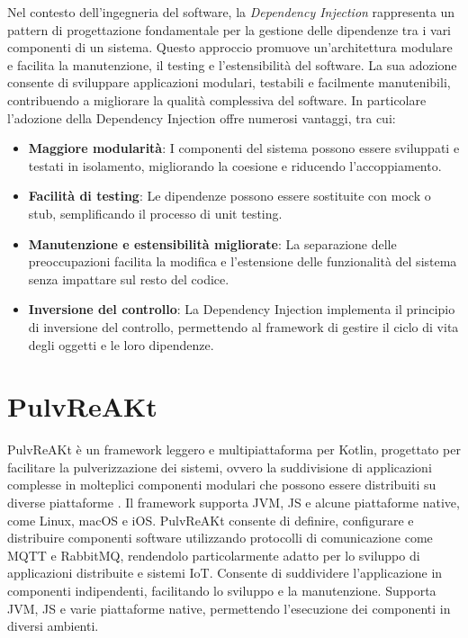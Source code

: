 \documentclass[12pt,a4paper,openright,twoside]{book}
\begin{document}
Nel contesto dell'ingegneria del software, la \textit{Dependency Injection} rappresenta un pattern di progettazione fondamentale per la gestione
delle dipendenze tra i vari componenti di un sistema. Questo approccio promuove un'architettura modulare e facilita la manutenzione, il testing e l'estensibilità del software.
La sua adozione consente di sviluppare applicazioni modulari, testabili e facilmente manutenibili, contribuendo a migliorare la qualità complessiva del software.
In particolare l'adozione della Dependency Injection offre numerosi vantaggi, tra cui:
\begin{itemize}
    \item \textbf{Maggiore modularità}: I componenti del sistema possono essere sviluppati e testati in isolamento, migliorando la coesione e riducendo l'accoppiamento.
    \item \textbf{Facilità di testing}: Le dipendenze possono essere sostituite con mock o stub, semplificando il processo di unit testing.
    \item \textbf{Manutenzione e estensibilità migliorate}: La separazione delle preoccupazioni facilita la modifica e l'estensione delle funzionalità del sistema
     senza impattare sul resto del codice.
    \item \textbf{Inversione del controllo}: La Dependency Injection implementa il principio di inversione del controllo,
     permettendo al framework di gestire il ciclo di vita degli oggetti e le loro dipendenze.
\end{itemize}
    
\section{PulvReAKt}
 PulvReAKt è un framework leggero e multipiattaforma per Kotlin, progettato per facilitare la pulverizzazione dei sistemi, ovvero la suddivisione di applicazioni complesse
 in molteplici componenti modulari che possono essere distribuiti su diverse piattaforme \cite{DBLP:journals/fi/CasadeiPPVW20}. 
Il framework supporta \ac{JVM}, \ac{JS} e alcune piattaforme native, come Linux, macOS e iOS. 
 PulvReAKt consente di definire, configurare e distribuire componenti software utilizzando protocolli di comunicazione come \ac{MQTT} e RabbitMQ, rendendolo particolarmente adatto 
 per lo sviluppo di applicazioni distribuite e sistemi \ac{IoT}. Consente di suddividere l'applicazione in componenti indipendenti, facilitando lo sviluppo e la manutenzione. 
 Supporta \ac{JVM}, \ac{JS} e varie piattaforme native, permettendo l'esecuzione dei componenti in diversi ambienti.
\pagebreak 
\end{document}
